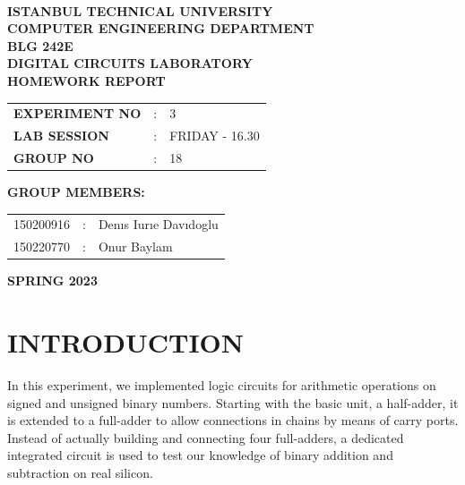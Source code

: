\documentclass{article}
\begin{document}
\begin{titlepage}
\begin{center}
\textbf{}\\
\textbf{\Large{ISTANBUL TECHNICAL UNIVERSITY}}\\
\vspace{0.5cm}
\textbf{\Large{COMPUTER ENGINEERING DEPARTMENT}}\\
\vspace{2cm}
\textbf{\Large{BLG 242E\\ DIGITAL CIRCUITS LABORATORY\\ HOMEWORK REPORT}}\\
\vspace{2.8cm}
\begin{table}[ht]
\centering
\Large{
\begin{tabular}{lcl}
\textbf{EXPERIMENT NO}  & : & 3 \\
\textbf{LAB SESSION}  & : & FRIDAY - 16.30 \\
\textbf{GROUP NO}  & : & 18 \\
\end{tabular}}
\end{table}
\vspace{1cm}
\textbf{\Large{GROUP MEMBERS:}}\\
\begin{table}[ht]
\centering
\Large{
\begin{tabular}{rcl}
150200916  & : & Denıs Iurıe Davıdoglu \\
150220770  & : & Onur Baylam \\
\end{tabular}}
\end{table}
\vspace{2.8cm}
\textbf{\Large{SPRING 2023}}

\end{center}

\end{titlepage}
\thispagestyle{empty}
\setcounter{tocdepth}{4}
\tableofcontents
\clearpage

\setcounter{page}{1}

\section{INTRODUCTION}
In this experiment, we implemented logic circuits for arithmetic operations on signed and unsigned binary numbers. Starting with the basic unit, a half-adder, it is extended to a full-adder to allow connections in chains by means of carry ports. Instead of actually building and connecting four full-adders, a dedicated integrated circuit is used to test our knowledge of binary addition and subtraction on real silicon.
\end{document}
